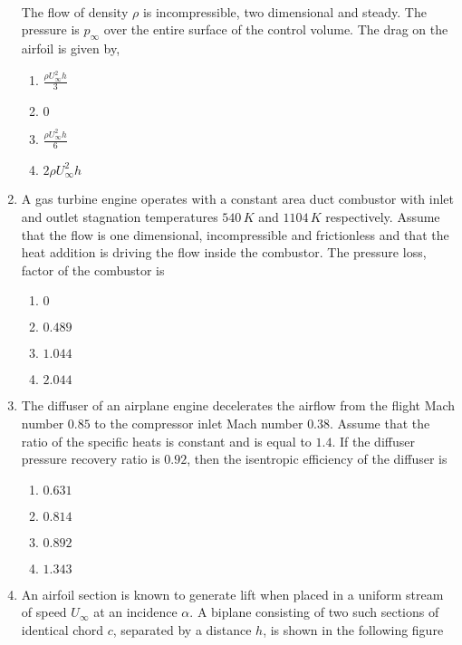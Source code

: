 \documentclass[journal]{IEEEtran}
\begin{document}
\begin{enumerate}
\begin{circuitikz}
\end{circuitikz}\\
The flow of density $\rho$ is incompressible, two dimensional and steady. The pressure is $p_\infty$ over the entire surface of the control volume. The drag on the airfoil is given by,
        \begin{enumerate}
            \item $\frac{\rho U_\infty^2h}{3}$
            \item $0$
            \item $\frac{\rho U_\infty^2h}{6}$
            \item $2\rho U_\infty^2h$
        \end{enumerate}
    \item A gas turbine engine operates with a constant area duct combustor with inlet and outlet stagnation temperatures $540\, K$ and $1104\, K$ respectively. Assume that the flow is one dimensional, incompressible and frictionless and that the heat addition is driving the flow inside the combustor. The pressure loss, factor  of the combustor is 
            \begin{enumerate}
                \item $0$
                \item $0.489$
                \item $1.044$
                \item $2.044$
            \end{enumerate}
    \item The diffuser of an airplane engine decelerates the airflow from the flight Mach number $0.85$ to the compressor inlet Mach number $0.38$. Assume that the ratio of the specific heats is constant and is equal to $1.4$. If the diffuser pressure recovery ratio is $0.92$, then the isentropic efficiency of the diffuser is
        \begin{enumerate}
            \item $0.631$
            \item $0.814$
            \item $0.892$
            \item $1.343$
        \end{enumerate}
    \item An airfoil section is known to generate lift when placed in a uniform stream of speed $U_\infty$ at an incidence $\alpha$. A biplane consisting of two such sections of identical chord $c$, separated by a distance $h$, is shown in the following figure


\end{enumerate}
\end{document}

